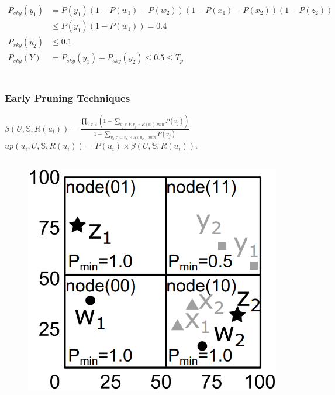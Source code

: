 \documentclass{beamer}
\begin{document}
\begin{frame}
\begin{columns}[c]
\begin{example}
\tiny
\begin{align*}
P_{sky}(y_1)&=P(y_1)(1-P(w_1)-P(w_2))(1-P(x_1)-P(x_2))(1-P(z_2))\\
            &\leq P(y_1)(1-P(w_1))=0.4\\
P_{sky}(y_2)&\leq0.1\\
P_{sky}(Y)& = P_{sky}(y_1) + P_{sky}(y_2) \leq 0.5 \leq T_p\\
\end{align*}
\end{example}
\end{columns}
\end{frame}

\begin{frame}
\frametitle{Early Pruning Techniques}

\begin{lemma}
$\beta(U, \mathbb{S}, R(u_i))=\frac{\prod\limits_{V\in\mathbb{S}}(1-\sum\limits_{v_j\in V,v_j\prec R(u_i).min}P(v_j))}{1- \sum\limits_{v_k\in U,v_k\prec R(u_k).min}P(v_j) }$\\

$up(u_i, U, \mathbb{S}, R(u_i)) = P(u_i)\times \beta(U, \mathbb{S}, R(u_i))$.
\end{lemma}

\begin{columns}[c] %
\begin{figure}[htpb]
  \begin{center}
	\includegraphics[width=\linewidth]{node.png}
  \end{center}
\end{figure}


\end{columns}
\end{frame}
\end{document}
